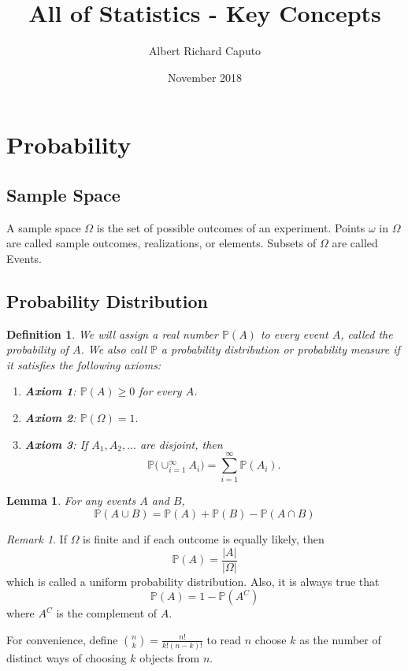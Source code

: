 \documentclass{article}
\title{All of Statistics - Key Concepts}
\author{Albert Richard Caputo}
\date{November 2018}
\newtheorem{definition}[counter]{Definition}
\newtheorem{lemma}[counter]{Lemma}
\theoremstyle{remark}
\newtheorem{remark}[counter]{Remark}
\newcommand{\1}{\mathbf{1}}
\newcommand{\Prob}{\mathbb{P}}
\begin{document}
\maketitle
\section{Probability}
\subsection{Sample Space}
A sample space $\Omega$ is the set of possible outcomes of an experiment. Points $\omega$ in $\Omega$ are called sample outcomes, realizations, or elements. Subsets of $\Omega$ are called Events.

\subsection{Probability Distribution}
\begin{definition}
	We will assign a real number $\Prob(A)$ to every event $A$, called the probability of $A$. We also call $\Prob$ a probability distribution or probability measure if it satisfies the following axioms:
	\begin{enumerate}
		\item \textbf{Axiom 1}: $\Prob(A) \geq 0$ for every $A$.
		\item \textbf{Axiom 2}: $\Prob(\Omega) = 1.$
		\item \textbf{Axiom 3}: If $A_1, A_2, ...$ are disjoint, then
		\[
		\Prob\Big(\cup_{i=1}^{\infty}A_i\Big) = \sum_{i=1}^{\infty} \Prob(A_i).
		\]
	\end{enumerate}
\end{definition}
\begin{lemma}
	For any events $A$ and $B$,
	\[
	\Prob(A \cup B) = \Prob(A) + \Prob(B) - \Prob(A \cap B)
	\]
\end{lemma}
\begin{remark}
	If $\Omega$ is finite and if each outcome is equally likely, then 
	\[
	\Prob(A) = \frac{|A|}{|\Omega|} 
	\]
	which is called a uniform probability distribution. Also, it is always true that 
	\[
	\Prob(A) = 1 - \Prob(A^C)
	\]
	where $A^C$ is the complement of $A$.\\
\end{remark}

\noindent For convenience, define $\binom{n}{k} = \frac{n!}{k!(n-k)!}$ to read $n$ choose $k$ as the number of distinct ways of choosing $k$ objects from $n$.
\end{document}
